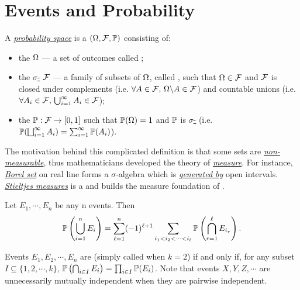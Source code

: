 \documentclass[main.tex]{subfiles}
\begin{document}
\minispacing

\section{Events and Probability}


A \href{https://en.wikipedia.org/wiki/Probability_space}{\it probability space} is a  $(\Omega,\mathcal{F},\mathbb{P})$ consisting of:

\begin{itemize}
	\item the  $\Omega$ --- a set of outcomes called ;
	\item the \href{https://en.wikipedia.org/wiki/%CE%A3-algebra}{$\sigma$-\ti{algebra}} $\mathcal{F}$ --- a family of subsets of $\Omega$, called \ti{events}, such that $\Omega \in \mathcal{F}$ and $\mathcal{F}$ is closed under complements (i.e. $\forall A \in \mathcal{F},\, \Omega \backslash A \in \mathcal{F}$) and countable unions (i.e. $\forall  A_i \in \mathcal{F},\, \bigcup_{i=1}^{\infty} A_i \in \mathcal{F}$);
	\item the  $\mathbb{P}: \mathcal{F} \rightarrow [0,1]$ such that $\mathbb{P}(\Omega)=1$ and $\mathbb{P}$ is \href{https://en.wikipedia.org/wiki/Sigma-additive_set_function}{$\sigma$-} (i.e. $\mathbb{P}(\bigsqcup_{i=1}^{\infty} A_i) = \sum_{i=1}^{\infty} \mathbb{P}(A_i)$).
\end{itemize}

The motivation behind this complicated definition is that some sets are \href{https://en.wikipedia.org/wiki/Non-measurable_set}{\it non-measurable}, thus mathematicians developed the theory of \href{https://en.wikipedia.org/wiki/Measure_(mathematics)}{\it measure}. For instance, \href{https://en.wikipedia.org/wiki/Borel_set}{\it Borel set} on real line forms a $\sigma$-algebra which is \href{https://en.wikipedia.org/wiki/Carathéodory%27s_extension_theorem}{\it generated by} open intervals. \href{https://en.wikipedia.org/wiki/Lebesgue–Stieltjes_integration}{\it Stieltjes measures} is a \ti{Borel measure} and builds the measure foundation of \ti{continuous probability distribution}.

\begin{lemma}
	Let $E_1,\cdots,E_n$ be any n events. Then
	\[
		\mathbb{P}\left(\bigcup_{i=1}^{n}E_i\right) = \sum_{\ell=1}^{n} (-1)^{\ell + 1} \sum_{i_1 < i_2 < \cdots < i_\ell} \mathbb{P} \left(\bigcap_{r=1}^{\ell}E_{i_r}\right).
	\]
\end{lemma}

Events $E_1,E_2,\cdots,E_n$ are  (simply called  when $k=2$) if and only if, for any subset $I \subseteq \{1,2,\cdots,k\}$,
$\mathbb{P}\left(\bigcap_{i\in I}E_i\right)=\prod_{i\in I}\mathbb{P}(E_i)$. Note that events $X,Y,Z,\cdots$ are unnecessarily mutually independent when they are pairwise independent.
\end{document}
